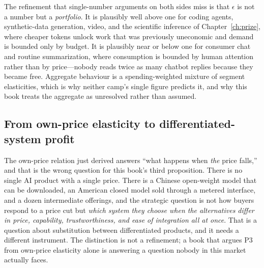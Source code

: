 The refinement that single-number arguments on both sides miss is that $\epsilon$ is not a number but a \emph{portfolio}. It is plausibly well above one for coding agents, synthetic-data generation, video, and the scientific inference of Chapter~\ref{ch:prize}, where cheaper tokens unlock work that was previously uneconomic and demand is bounded only by budget. It is plausibly near or below one for consumer chat and routine summarization, where consumption is bounded by human attention rather than by price---nobody reads twice as many chatbot replies because they became free. Aggregate behaviour is a spending-weighted mixture of segment elasticities, which is why neither camp's single figure predicts it, and why this book treats the aggregate as unresolved rather than assumed.

\subsection{From own-price elasticity to differentiated-system profit}
\label{sec:crossprice}

The own-price relation just derived answers ``what happens when \emph{the} price falls,'' and that is the wrong question for this book's third proposition. There is no single AI product with a single price. There is a Chinese open-weight model that can be downloaded, an American closed model sold through a metered interface, and a dozen intermediate offerings, and the strategic question is not how buyers respond to a price cut but \emph{which system they choose when the alternatives differ in price, capability, trustworthiness, and ease of integration all at once}. That is a question about substitution between differentiated products, and it needs a different instrument. The distinction is not a refinement; a book that argues P3 from own-price elasticity alone is answering a question nobody in this market actually faces.

